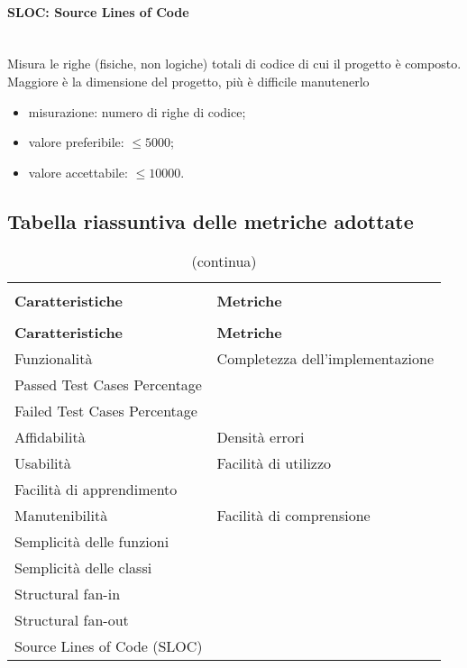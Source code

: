 			\paragraph{SLOC: Source Lines of Code}\mbox{}\\
			Misura le righe (fisiche, non logiche) totali di codice di cui il progetto è composto. Maggiore è la dimensione del progetto, più è difficile manutenerlo
			\begin{itemize}
				\item misurazione: numero di righe di codice;
				\item valore preferibile: $\leq5000$;
				\item valore accettabile: $\leq10000$.
			\end{itemize}
		
\pagebreak

\subsection{Tabella riassuntiva delle metriche adottate}
\begin{longtable}{ >{\centering}p{}
		>{\centering}p{}}
	\rowcolor{white}\caption{Tabella riassuntiva delle metriche adottate}\\
	\rowcolorhead
	\textbf{\color{white}Caratteristiche}
	& \textbf{\color{white}Metriche}
	\tabularnewline 	
	\endfirsthead
	\rowcolor{white}\caption[]{(continua)} \\
	\rowcolorhead 
	\textbf{\color{white}Caratteristiche}
	& \textbf{\color{white}Metriche} 
	\tabularnewline
	\endhead
	
	Funzionalità & Completezza dell'implementazione\\ Passed Test Cases Percentage \\ Failed Test Cases Percentage
	
	\tabularnewline
	\rowcolordark
	Affidabilità & Densità errori 
	
	\tabularnewline
	\rowcolorlight
	Usabilità & Facilità di utilizzo\\ Facilità di apprendimento
	
	\tabularnewline
	\rowcolordark
	Manutenibilità & Facilità di comprensione\\
	Semplicità delle funzioni \\Semplicità delle classi \\ Structural fan-in \\Structural fan-out \\Source Lines of Code (SLOC)
	\tabularnewline
	
\end{longtable}
